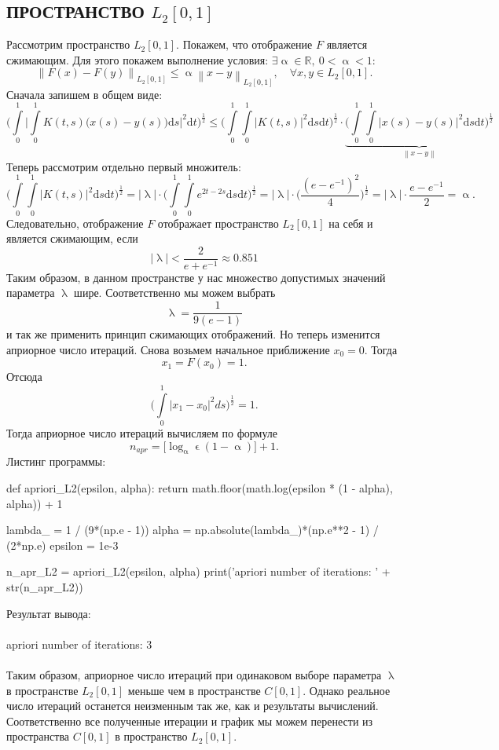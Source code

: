 \documentclass[a4paper, 12pt]{report}
\newcommand\Norm[1]{\left\| #1 \right\|}
\renewcommand{\leq}{\leqslant}
\renewcommand{\alpha}{\upalpha}
\renewcommand{\lambda}{\uplambda}
\renewcommand{\epsilon}{\upvarepsilon}
\begin{document}
			\subsection*{ПРОСТРАНСТВО $L_2[0,1]$}
			Рассмотрим пространство $L_2[0,1]$. Покажем, что отображение $F$ является сжимающим. Для этого покажем выполнение условия: $\exists \alpha \in \mathbb{R},\ 0<\alpha<1:$ $$\Norm{F(x) - F(y)}_{L_2[0,1]} \leq \alpha\Norm{x - y}_{L_2[0,1]},\quad \forall x,y \in {L_2[0,1]}.$$
			Сначала запишем в общем виде:
			$$\Big(\int\limits_0^1\Big|\int\limits_0^1 K(t,s) \big(x(s) - y(s)\big)\mathrm{d}s\Big|^2\mathrm{d}t\Big)^\frac12
			\leq \Big(\int\limits_0^1\int\limits_0^1 |K(t,s)|^2 \mathrm{d}s\mathrm{d}t\Big)^\frac12\cdot\underbrace{ \Big(\int\limits_0^1\int\limits_0^1 |x(s) - y(s)|^2 \mathrm{d}s\mathrm{d}t\Big)^\frac12}_{\Norm{x-y}}$$
			Теперь рассмотрим отдельно первый множитель:
			$$\Big(\int\limits_0^1\int\limits_0^1 |K(t,s)|^2 \mathrm{d}s\mathrm{d}t\Big)^\frac12 = |\lambda|\cdot \Big(\int\limits_0^1\int\limits_0^1 e^{2t-2s} \mathrm{d}s\mathrm{d}t\Big)^\frac12 = |\lambda|\cdot \Big(\dfrac{(e - e^{-1})^2}{4}\Big)^\frac12 = |\lambda|\cdot\dfrac{e - e^{-1}}{2} = \alpha.$$
			Следовательно, отображение $F$ отображает пространство $L_2[0,1]$ на себя и является сжимающим, если $$|\lambda| < \dfrac{2}{e + e^{-1}}\approx 0.851$$
			Таким образом, в данном пространстве у нас множество допустимых значений параметра $\lambda$ шире. Соответственно мы можем выбрать $$\lambda = \dfrac{1}{9(e-1)}$$ и так же применить принцип сжимающих отображений. Но теперь изменится априорное число итераций. Снова возьмем начальное приближение $x_0 = 0$. Тогда $$x_1 = F(x_0) = 1.$$
			Отсюда $$\Big(\int\limits_0^1|x_1 - x_0|^2ds\Big)^\frac12 = 1.$$
			Тогда априорное число итераций вычисляем по формуле $$n_{apr} = \Big[\log_\alpha \epsilon(1-\alpha)\Big] + 1.$$
			Листинг программы:
			\begin{python}
				def apriori_L2(epsilon, alpha):
					return math.floor(math.log(epsilon * (1 - alpha), alpha)) + 1
				
				lambda_ = 1 / (9*(np.e - 1))
				alpha = np.absolute(lambda_)*(np.e**2 - 1) / (2*np.e)
				epsilon = 1e-3
				
				n_apr_L2 = apriori_L2(epsilon, alpha)
				print('apriori number of iterations: ' + str(n_apr_L2))\end{python}
				Результат вывода:\\\\
				apriori number of iterations: 3\\\\
				Таким образом, априорное число итераций при одинаковом выборе параметра $\lambda$ в пространстве $L_2[0,1]$ меньше чем в пространстве $C[0,1]$. Однако реальное число итераций останется неизменным так же, как и результаты вычислений. Соответственно все полученные итерации и график мы можем перенести из пространства $C[0,1]$ в пространство $L_2[0,1]$.
\end{document}
